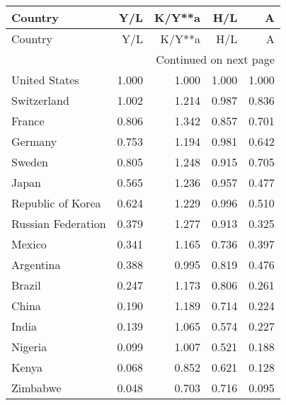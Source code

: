 \begin{longtable}{lrrrr}
\toprule
           Country &   Y/L &  K/Y**a &   H/L &     A \\
\hline
\midrule
\endfirsthead

\toprule
           Country &   Y/L &  K/Y**a &   H/L &     A \\
\midrule
\endhead
\midrule
\multicolumn{5}{r}{{Continued on next page}} \\
\midrule
\endfoot

\bottomrule
\endlastfoot
     United States & 1.000 &   1.000 & 1.000 & 1.000 \\
       Switzerland & 1.002 &   1.214 & 0.987 & 0.836 \\
            France & 0.806 &   1.342 & 0.857 & 0.701 \\
           Germany & 0.753 &   1.194 & 0.981 & 0.642 \\
            Sweden & 0.805 &   1.248 & 0.915 & 0.705 \\
             Japan & 0.565 &   1.236 & 0.957 & 0.477 \\
 Republic of Korea & 0.624 &   1.229 & 0.996 & 0.510 \\
Russian Federation & 0.379 &   1.277 & 0.913 & 0.325 \\
            Mexico & 0.341 &   1.165 & 0.736 & 0.397 \\
         Argentina & 0.388 &   0.995 & 0.819 & 0.476 \\
            Brazil & 0.247 &   1.173 & 0.806 & 0.261 \\
             China & 0.190 &   1.189 & 0.714 & 0.224 \\
             India & 0.139 &   1.065 & 0.574 & 0.227 \\
           Nigeria & 0.099 &   1.007 & 0.521 & 0.188 \\
             Kenya & 0.068 &   0.852 & 0.621 & 0.128 \\
          Zimbabwe & 0.048 &   0.703 & 0.716 & 0.095 \\
\end{longtable}